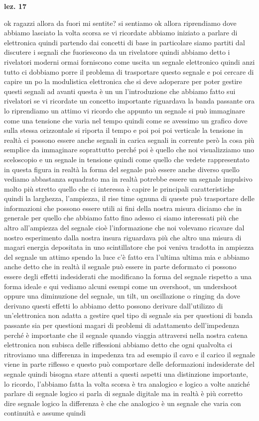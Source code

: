 \textbf{lez. 17}

ok ragazzi allora da fuori mi sentite? si sentiamo ok allora riprendiamo dove abbiamo lasciato la volta scorsa se vi ricordate abbiamo iniziato a parlare di elettronica quindi partendo dai concetti di base in particolare siamo partiti dal discutere i segnali che fuoriescono da un rivelatore quindi abbiamo detto i rivelatori moderni ormai forniscono come uscita un segnale elettronico quindi anzi tutto ci dobbiamo porre il problema di trasportare questo segnale e poi cercare di capire un po la modulistica elettronica che si deve adoperare per poter gestire questi segnali ad avanti questa è un un l'introduzione che abbiamo fatto sui rivelatori se vi ricordate un concetto importante riguardava la banda passante ora lo riprendiamo un attimo vi ricordo che appunto un segnale si può immaginare come una tensione che varia nel tempo quindi come se avessimo un grafico dove sulla stessa orizzontale si riporta il tempo e poi poi poi verticale la tensione in realtà ci possono essere anche segnali in carica segnali in corrente però la cosa più semplice da immaginare soprattutto perché poi è quello che noi visualizziamo uno sceloscopio e un segnale in tensione quindi come quello che vedete rappresentato in questa figura in realtà la forma del segnale può essere anche diverso quello vediamo abbastanza squadrato ma in realtà potrebbe essere un segnale impulsivo molto più stretto quello che ci interessa è capire le principali caratteristiche quindi la larghezza, l'ampiezza, il rise time ognuna di queste può trasportare delle informazioni che possono essere utili ai fini della nostra misura diciamo che in generale per quello che abbiamo fatto fino adesso ci siamo interessati più che altro all'ampiezza del segnale cioè l'informazione che noi volevamo ricavare dal nostro esperimento dalla nostra insura riguardava più che altro una misura di magari energia depositata in uno scintillatore che poi veniva tradotta in ampiezza del segnale un attimo spendo la luce c'è fatto era l'ultima ultima mia e abbiamo anche detto che in realtà il segnale può essere in parte deformato ci possono essere degli effetti indesiderati che modificano la forma del segnale rispetto a una forma ideale e qui vediamo alcuni esempi come un overshoot, un undershoot oppure una diminuzione del segnale, un tilt, un oscillazione o ringing da dove derivano questi effetti lo abbiamo detto possono derivare dall'utilizzo di un'elettronica non adatta a gestire quel tipo di segnale sia per questioni di banda passante sia per questioni magari di problemi di adattamento dell'impedenza perché è importante che il segnale quando viaggia attraversi nella nostra catena elettronica non subisca delle riflessioni abbiamo detto che ogni qualvolta ci ritroviamo una differenza in impedenza tra ad esempio il cavo e il carico il segnale viene in parte riflesso e questo può comportare delle deformazioni indesiderate del segnale quindi bisogna stare attenti a questi aspetti una distinzione importante, lo ricordo, l'abbiamo fatta la volta scorsa è tra analogico e logico a volte anziché parlare di segnale logico si parla di segnale digitale ma in realtà è più corretto dire segnale logico la differenza è che che analogico è un segnale che varia con continuità e assume quindi 
